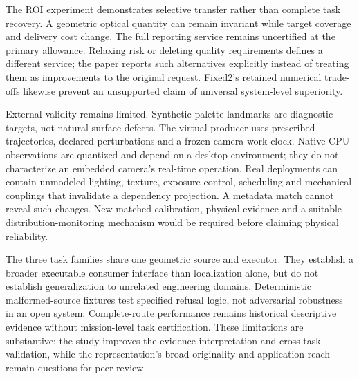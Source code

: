 The ROI experiment demonstrates selective transfer rather than complete task recovery. A geometric optical quantity can remain invariant while target coverage and delivery cost change. The full reporting service remains uncertified at the primary allowance. Relaxing risk or deleting quality requirements defines a different service; the paper reports such alternatives explicitly instead of treating them as improvements to the original request. Fixed2's retained numerical trade-offs likewise prevent an unsupported claim of universal system-level superiority.

External validity remains limited. Synthetic palette landmarks are diagnostic targets, not natural surface defects. The virtual producer uses prescribed trajectories, declared perturbations and a frozen camera-work clock. Native CPU observations are quantized and depend on a desktop environment; they do not characterize an embedded camera's real-time operation. Real deployments can contain unmodeled lighting, texture, exposure-control, scheduling and mechanical couplings that invalidate a dependency projection. A metadata match cannot reveal such changes. New matched calibration, physical evidence and a suitable distribution-monitoring mechanism would be required before claiming physical reliability.

The three task families share one geometric source and executor. They establish a broader executable consumer interface than localization alone, but do not establish generalization to unrelated engineering domains. Deterministic malformed-source fixtures test specified refusal logic, not adversarial robustness in an open system. Complete-route performance remains historical descriptive evidence without mission-level task certification. These limitations are substantive: the study improves the evidence interpretation and cross-task validation, while the representation's broad originality and application reach remain questions for peer review.


